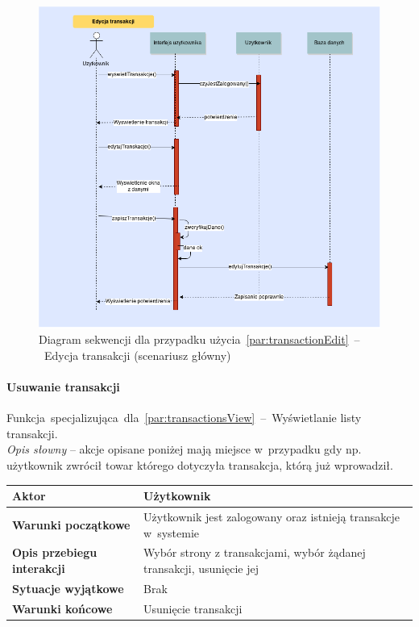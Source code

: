\begin{figure}[H]
  \includegraphics[width=\textwidth]{images/edycja_transakcji.png}
  \caption{Diagram sekwencji dla przypadku użycia~\ref{par:transactionEdit}~--~Edycja transakcji (scenariusz główny)}
\end{figure}

\paragraph{Usuwanie transakcji\newline}
\label{par:transactionDelete}
Funkcja~specjalizująca~dla~\ref{par:transactionsView}~--~Wyświetlanie listy transakcji.\\

\textit{Opis słowny} -- akcje opisane poniżej mają miejsce w~przypadku gdy np. użytkownik zwrócił towar którego dotyczyła transakcja, którą już wprowadził.

\begin{longtable}{|p{5cm}|p{7cm}|}
  \hline \textbf{Aktor} & Użytkownik \\
  \hline \textbf{Warunki początkowe} & Użytkownik jest zalogowany oraz istnieją transakcje w~systemie \\
  \hline \textbf{Opis przebiegu interakcji} & Wybór strony z transakcjami, wybór żądanej transakcji, usunięcie jej \\
  \hline \textbf{Sytuacje wyjątkowe} & Brak \\
  \hline \textbf{Warunki końcowe} & Usunięcie transakcji \\
  \hline
\end{longtable}

